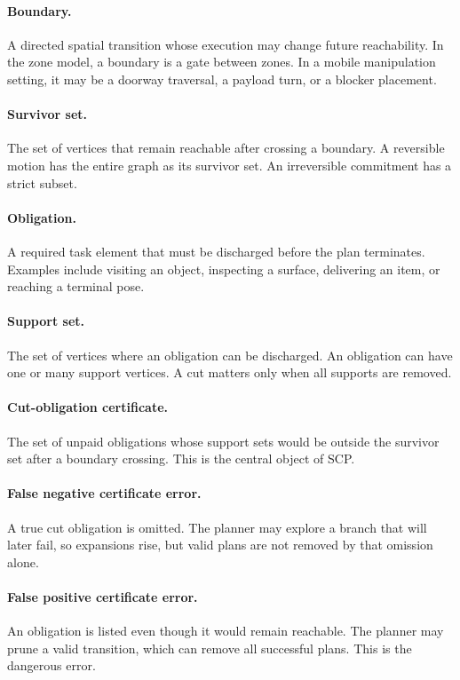 \documentclass{article}
\begin{document}
\paragraph{Boundary.}
A directed spatial transition whose execution may change future reachability. In the zone model, a boundary is a gate between zones. In a mobile manipulation setting, it may be a doorway traversal, a payload turn, or a blocker placement.

\paragraph{Survivor set.}
The set of vertices that remain reachable after crossing a boundary. A reversible motion has the entire graph as its survivor set. An irreversible commitment has a strict subset.

\paragraph{Obligation.}
A required task element that must be discharged before the plan terminates. Examples include visiting an object, inspecting a surface, delivering an item, or reaching a terminal pose.

\paragraph{Support set.}
The set of vertices where an obligation can be discharged. An obligation can have one or many support vertices. A cut matters only when all supports are removed.

\paragraph{Cut-obligation certificate.}
The set of unpaid obligations whose support sets would be outside the survivor set after a boundary crossing. This is the central object of SCP.

\paragraph{False negative certificate error.}
A true cut obligation is omitted. The planner may explore a branch that will later fail, so expansions rise, but valid plans are not removed by that omission alone.

\paragraph{False positive certificate error.}
An obligation is listed even though it would remain reachable. The planner may prune a valid transition, which can remove all successful plans. This is the dangerous error.
\end{document}
